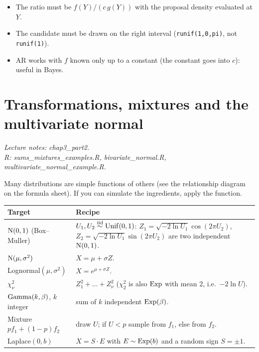 \begin{traps}
\begin{itemize}
  \item The ratio must be $f(Y)/(c\,g(Y))$ with the proposal density evaluated at $Y$.
  \item The candidate must be drawn on the right interval (\texttt{runif(1,0,pi)}, not \texttt{runif(1)}).
  \item AR works with $f$ known only up to a constant (the constant goes into $c$): useful in Bayes.
\end{itemize}
\end{traps}

\section{Transformations, mixtures and the multivariate normal}
\textit{Lecture notes: chap3\_part2.\\ R: sums\_mixtures\_examples.R, bivariate\_normal.R,\\ multivariate\_normal\_example.R.}

\begin{idea}
Many distributions are simple functions of others (see the relationship diagram on the formula sheet). If you can simulate the ingredients, apply the function.
\end{idea}

\begin{center}
\begin{tabularx}{\textwidth}{lX}
\toprule
Target & Recipe \\
\midrule
$\mathrm{N}(0,1)$ (Box--Muller) & $U_1,U_2\overset{\text{iid}}{\sim}\mathrm{Unif}(0,1)$: $Z_1 = \sqrt{-2\ln U_1}\cos(2\pi U_2)$, $Z_2 = \sqrt{-2\ln U_1}\sin(2\pi U_2)$ are two independent $\mathrm{N}(0,1)$. \\
$\mathrm{N}(\mu,\sigma^2)$ & $X = \mu + \sigma Z$. \\
Lognormal$(\mu,\sigma^2)$ & $X = e^{\mu+\sigma Z}$. \\
$\chi^2_\nu$ & $Z_1^2+\dots+Z_\nu^2$ ($\chi^2_2$ is also $\mathrm{Exp}$ with mean 2, i.e.\ $-2\ln U$). \\
$\mathrm{Gamma}(k,\beta)$, $k$ integer & sum of $k$ independent $\mathrm{Exp}(\beta)$. \\
Mixture $p f_1 + (1-p) f_2$ & draw $U$; if $U<p$ sample from $f_1$, else from $f_2$. \\
Laplace$(0,b)$ & $X = S\cdot E$ with $E\sim\mathrm{Exp}(b)$ and a random sign $S=\pm1$. \\
\bottomrule
\end{tabularx}
\end{center}


